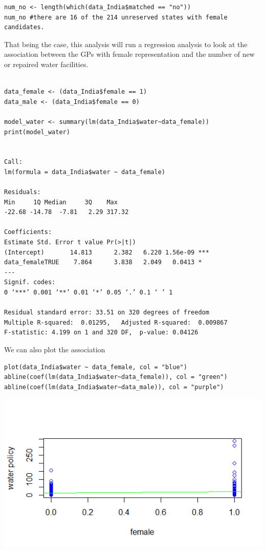 \documentclass[12pt,letterpaper]{article}
\begin{document}
\begin{enumerate}
\begin{verbatim}
num_no <- length(which(data_India$matched == "no"))
num_no #there are 16 of the 214 unreserved states with female candidates.

	\end{verbatim}
	
That being the case, this analysis will  run a regression analysis to look at the association between the GPs with female representation and the number of new or repaired water facilities.  
	
	\begin{verbatim}

data_female <- (data_India$female == 1)
data_male <- (data_India$female == 0)

model_water <- summary(lm(data_India$water~data_female))
print(model_water)


Call:
lm(formula = data_India$water ~ data_female)

Residuals:
Min     1Q Median     3Q    Max 
-22.68 -14.78  -7.81   2.29 317.32 

Coefficients:
Estimate Std. Error t value Pr(>|t|)    
(Intercept)       14.813      2.382   6.220 1.56e-09 ***
data_femaleTRUE    7.864      3.838   2.049   0.0413 *  
---
Signif. codes:  
0 ‘***’ 0.001 ‘**’ 0.01 ‘*’ 0.05 ‘.’ 0.1 ‘ ’ 1

Residual standard error: 33.51 on 320 degrees of freedom
Multiple R-squared:  0.01295,	Adjusted R-squared:  0.009867 
F-statistic: 4.199 on 1 and 320 DF,  p-value: 0.04126

	\end{verbatim}
	
We can also plot the association 

	\begin{verbatim}
plot(data_India$water ~ data_female, col = "blue")
abline(coef(lm(data_India$water~data_female)), col = "green")
abline(coef(lm(data_India$water~data_male)), col = "purple")
	\end{verbatim}
	
\includegraphics{Rplot_just_green}




\end{enumerate}
\end{document}
